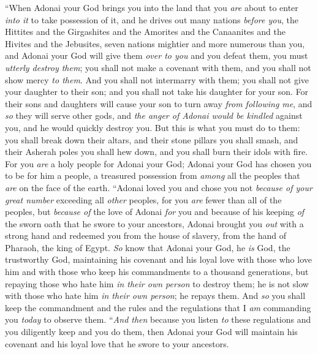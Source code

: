 \begin{biblechapter} %
\verse “When Adonai your God brings you into the land that you \textit{are} about to enter \textit{into it} to take possession of it, and he drives out many nations \textit{before you}, the Hittites and the Girgashites and the Amorites and the Canaanites and the Hivites and the Jebusites, seven nations mightier and more numerous than you,
\verse and Adonai your God will give them \textit{over to you} and you defeat them, you must \textit{utterly destroy them}; you shall not make a covenant with them, and you shall not show mercy \textit{to them}.
\verse And you shall not intermarry with them; you shall not give your daughter to their son; and you shall not take his daughter for your son.
\verse For their sons and daughters will cause your son to turn away \textit{from following me}, and \textit{so} they will serve other gods, and \textit{the anger of Adonai would be kindled} against you, and he would quickly destroy you.
\verse But this is what you must do to them: you shall break down their altars, and their stone pillars you shall smash, and their Asherah poles you shall hew down, and you shall burn their idols with fire.
\verse For you \textit{are} a holy people for Adonai your God; Adonai your God has chosen you to be for him a people, a treasured possession from \textit{among} all the peoples that \textit{are} on the face of the earth.
\verse “Adonai loved you and chose you not \textit{because of your great number} exceeding all \textit{other} peoples, for you \textit{are} fewer than all of the peoples,
\verse but \textit{because of} the love of Adonai \textit{for} you and because of his keeping \textit{of} the sworn oath that he swore to your ancestors, Adonai brought you \textit{out} with a strong hand and redeemed you from the house of slavery, from the hand of Pharaoh, the king of Egypt.
\verse \textit{So} know that Adonai your God, he \textit{is} God, the trustworthy God, maintaining his covenant and his loyal love with those who love him and with those who keep his commandments to a thousand generations,
\verse but repaying those who hate him \textit{in their own person} to destroy them; he is not slow with those who hate him \textit{in their own person}; he repays them.
\verse And \textit{so} you shall keep the commandment and the rules and the regulations that I \textit{am} commanding you \textit{today} to observe them.
\verse “\textit{And then} because you listen \textit{to} these regulations and you diligently keep and you do them, then Adonai your God will maintain his covenant and his loyal love that he swore to your ancestors.

\end{biblechapter}
